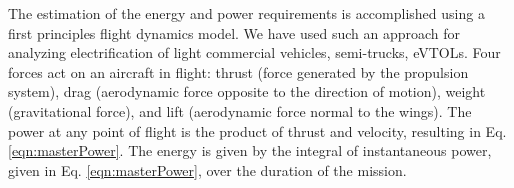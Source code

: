 The estimation of the energy and power requirements is accomplished using a first principles flight dynamics model.  We have used such an approach for analyzing electrification of light commercial vehicles,\cite{sripad2017evaluation} semi-trucks,\cite{sripad2017performance} eVTOLs.\cite{fredericks2018performance}   Four forces act on an aircraft in flight: thrust (force generated by the propulsion system), drag (aerodynamic force opposite to the direction of motion), weight (gravitational force), and lift (aerodynamic force normal to the wings). The power at any point of flight is the product of thrust and velocity, resulting in Eq. \eqref{eqn:masterPower}. The energy is given by the integral of instantaneous power, given in Eq. \eqref{eqn:masterPower}, over the duration of the mission.